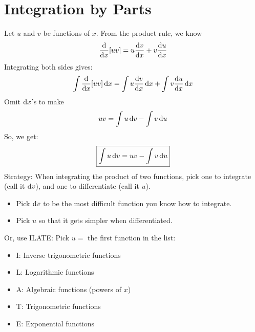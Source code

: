 \section{Integration by Parts}
Let $ u $ and $ v $ be functions of $ x $. From the product rule, we know
\[ \odv{}{x}[uv]=u \odv{v}{x}+v \odv{u}{x} \]
Integrating both sides gives:
\[ \int \odv{}{x} [uv]\odif{x}=\int u \odv{v}{x} \odif{x}+
    \int v \odv{u}{x} \odif{x}   \]
Omit $ \odif{x} $'s to make
\[ uv=\int u\odif{v} -\int v\odif{u} \]
So, we get:
\[ \boxed{\int u\odif{v} =uv-\int v\odif{u}} \]
Strategy: When integrating the product of two functions, pick one to
integrate (call it $ \odif{v} $), and one to differentiate (call it $ u $).
\begin{itemize}
    \item Pick $ \odif{v} $ to be the most difficult function you know how to integrate.
    \item Pick $ u $ so that it gets simpler when differentiated.
\end{itemize}
Or, use ILATE\@: Pick $ u= $ the first function in the list:
\begin{itemize}
    \item I\@: Inverse trigonometric functions
    \item L\@: Logarithmic functions
    \item A\@: Algebraic functions (powers of $ x $)
    \item T\@: Trigonometric functions
    \item E\@: Exponential functions
\end{itemize}

